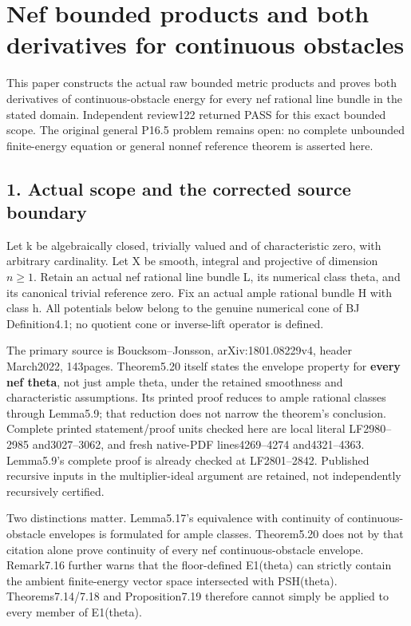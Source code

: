 \documentclass[
]{article}
\author{}
\date{}
\begin{document}
\section{Nef bounded products and both derivatives for continuous
obstacles}\label{nef-bounded-products-and-both-derivatives-for-continuous-obstacles}

This paper constructs the actual raw bounded metric products and proves
both derivatives of continuous-obstacle energy for every nef rational
line bundle in the stated domain. Independent review122 returned PASS
for this exact bounded scope. The original general P16.5 problem remains
open: no complete unbounded finite-energy equation or general nonnef
reference theorem is asserted here.

\subsection{1. Actual scope and the corrected source
boundary}\label{actual-scope-and-the-corrected-source-boundary}

Let k be algebraically closed, trivially valued and of characteristic
zero, with arbitrary cardinality. Let X be smooth, integral and
projective of dimension \(n\geq1\). Retain an actual nef rational line
bundle L, its numerical class theta, and its canonical trivial reference
zero. Fix an actual ample rational bundle H with class h. All potentials
below belong to the genuine numerical cone of BJ Definition4.1; no
quotient cone or inverse-lift operator is defined.

The primary source is Boucksom--Jonsson, arXiv:1801.08229v4, header
March2022, 143pages. Theorem5.20 itself states the envelope property for
\textbf{every nef theta}, not just ample theta, under the retained
smoothness and characteristic assumptions. Its printed proof reduces to
ample rational classes through Lemma5.9; that reduction does not narrow
the theorem's conclusion. Complete printed statement/proof units checked
here are local literal LF2980--2985 and3027--3062, and fresh native-PDF
lines4269--4274 and4321--4363. Lemma5.9's complete proof is already
checked at LF2801--2842. Published recursive inputs in the
multiplier-ideal argument are retained, not independently recursively
certified.

Two distinctions matter. Lemma5.17's equivalence with continuity of
continuous-obstacle envelopes is formulated for ample classes.
Theorem5.20 does not by that citation alone prove continuity of every
nef continuous-obstacle envelope. Remark7.16 further warns that the
floor-defined E1(theta) can strictly contain the ambient finite-energy
vector space intersected with PSH(theta). Theorems7.14/7.18 and
Proposition7.19 therefore cannot simply be applied to every member of
E1(theta).
\end{document}
